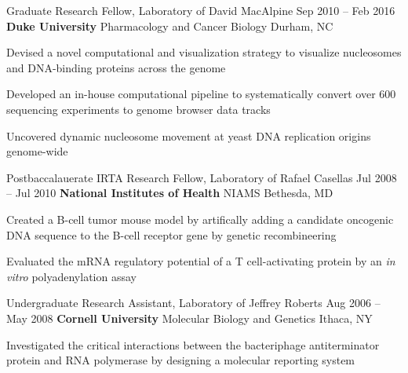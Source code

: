 
\begin{resentries}

  \resentry
    {Graduate Research Fellow, Laboratory of David MacAlpine}
    {Sep 2010 -- Feb 2016}
    {\textbf{Duke University} \xspace \bullet \xspace \xspace Pharmacology and Cancer Biology} %
    {Durham, NC} %
    {
      \begin{cvitems} %
        \item{Devised a novel computational and visualization strategy to visualize nucleosomes and DNA-binding proteins across the genome}
        \item{Developed an in-house computational pipeline to systematically convert over 600 sequencing experiments to genome browser data tracks}
        \item{Uncovered dynamic nucleosome movement at yeast DNA replication origins genome-wide} 
      \end{cvitems}
    }

  \resentry
    {Postbaccalauerate IRTA Research Fellow, Laboratory of Rafael Casellas}
    {Jul 2008 -- Jul 2010}
    {\textbf{National Institutes of Health} \xspace \bullet \xspace \xspace NIAMS}
    {Bethesda, MD}
    {
      \begin{cvitems} %
        \item{Created a B-cell tumor mouse model by artifically adding a candidate oncogenic DNA sequence to the B-cell receptor gene by genetic recombineering}
        \item{Evaluated the mRNA regulatory potential of a T cell-activating protein by an \textit{in vitro} polyadenylation assay}
      \end{cvitems}
    }

  \resentry
    {Undergraduate Research Assistant, Laboratory of Jeffrey Roberts}
    {Aug 2006 -- May 2008}
    {\textbf{Cornell University} \xspace \bullet \xspace \xspace Molecular Biology and Genetics}
    {Ithaca, NY}
    {
      \begin{cvitems} %
        \item{Investigated the critical interactions between the bacteriphage antiterminator protein and RNA polymerase by designing a molecular reporting system}
      \end{cvitems}
    }

\end{resentries}
\vspace{-2mm}
